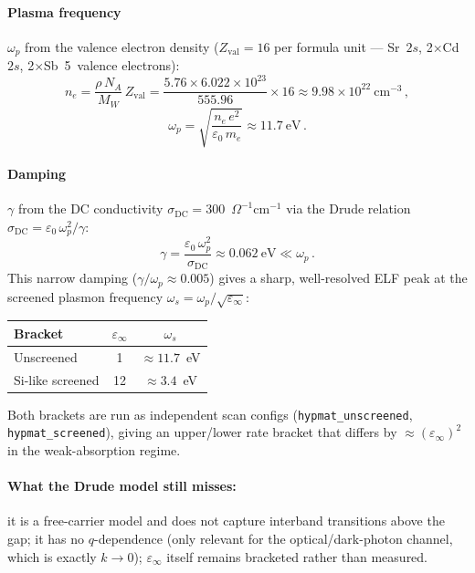 \paragraph{Plasma frequency} $\omega_p$ from the valence electron density
($Z_\mathrm{val}=16$ per formula unit — Sr~$2s$, 2$\times$Cd~$2s$,
2$\times$Sb~5~valence electrons):
\begin{equation}
n_e = \frac{\rho\,N_A}{M_W}\,Z_\mathrm{val}
= \frac{5.76\times6.022\times10^{23}}{555.96}\times 16
\approx 9.98\times10^{22}\ \mathrm{cm}^{-3}\,,
\end{equation}
\begin{equation}
\omega_p = \sqrt{\frac{n_e\,e^2}{\varepsilon_0\,m_e}} \approx 11.7\ \mathrm{eV}\,.
\end{equation}

\paragraph{Damping} $\gamma$ from the DC conductivity
$\sigma_\mathrm{DC}=300$~$\Omega^{-1}\mathrm{cm}^{-1}$ via the Drude
relation $\sigma_\mathrm{DC} = \varepsilon_0\,\omega_p^2/\gamma$:
\begin{equation}
\gamma = \frac{\varepsilon_0\,\omega_p^2}{\sigma_\mathrm{DC}} \approx 0.062\ \mathrm{eV} \ll \omega_p\,.
\end{equation}
This narrow damping ($\gamma/\omega_p\approx0.005$) gives a sharp,
well-resolved ELF peak at the screened plasmon frequency
$\omega_s = \omega_p/\sqrt{\varepsilon_\infty}$:

\begin{center}
\begin{tabular}{@{}lcc@{}}
\toprule
Bracket & $\varepsilon_\infty$ & $\omega_s$ \\
\midrule
Unscreened & 1 & $\approx 11.7$~eV \\
Si-like screened & 12 & $\approx 3.4$~eV \\
\bottomrule
\end{tabular}
\end{center}

Both brackets are run as independent scan configs
(\texttt{hypmat\_unscreened}, \texttt{hypmat\_screened}), giving an
upper/lower rate bracket that differs by $\approx(\varepsilon_\infty)^2$ in
the weak-absorption regime.

\paragraph{What the Drude model still misses:} it is a free-carrier model
and does not capture interband transitions above the gap; it has no
$q$-dependence (only relevant for the optical/dark-photon channel, which is
exactly $k\to0$); $\varepsilon_\infty$ itself remains bracketed rather than
measured.

